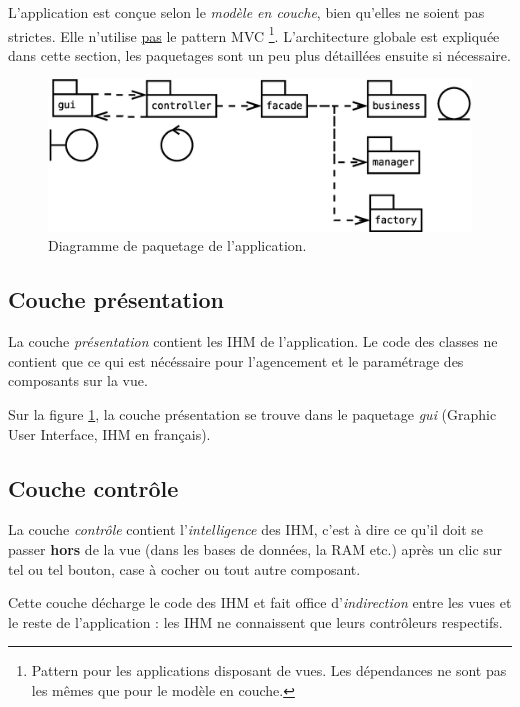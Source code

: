 \label{partie_architecture}
L'application est conçue selon le \textit{modèle en couche}, bien qu'elles ne soient pas strictes.
Elle n'utilise \underline{pas} le pattern MVC
\footnote{\label{MVC_pas_utile}Pattern pour les applications disposant de vues.
  Les dépendances ne sont pas les mêmes que pour le modèle en couche.}.
L'architecture globale est expliquée dans cette section, les paquetages sont un peu plus détaillées ensuite si nécessaire.

\begin{figure}[!h]
  \centering
  \includegraphics[width=14cm]{images/paquetage.eps}
  \caption{Diagramme de paquetage de l'application.}
  \label{diagramme_de_paquetage_idb}
\end{figure}

\subsection{Couche présentation}
La couche \textit{présentation} contient les IHM de l'application.
Le code des classes ne contient que ce qui est nécéssaire pour l'agencement et le paramétrage des composants sur la vue.

Sur la figure \ref{diagramme_de_paquetage_idb}, la couche présentation se trouve dans le paquetage \textit{gui} (Graphic User Interface, IHM en français).

\subsection{Couche contrôle}
La couche \textit{contrôle} contient l'\textit{intelligence} des IHM, c'est à dire ce qu'il doit se passer \textbf{hors} de la vue (dans les bases de données, la RAM etc.) après un clic sur tel ou tel bouton, case à cocher ou tout autre composant.

Cette couche décharge le code des IHM et fait office d'\textit{indirection} entre les vues et le reste de l'application : les IHM ne connaissent que leurs contrôleurs respectifs.

